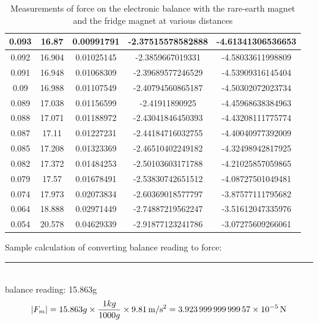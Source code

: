 \documentclass[letterpaper]{article}
\begin{document}
\begin{table}[H]
{\begin{tabular}{|c|c|c|c|c|}
   0.093          & 16.87               & 0.00991791            & -2.37515578582888  & -4.61341306536653 \\ \hline
   0.092          & 16.904              & 0.01025145            & -2.3859667019331   & -4.58033611998809 \\ \hline
   0.091          & 16.948              & 0.01068309            & -2.39689577246529  & -4.53909316145404 \\ \hline
   0.09           & 16.988              & 0.01107549            & -2.40794560865187  & -4.50302072023734 \\ \hline
   0.089          & 17.038              & 0.01156599            & -2.41911890925     & -4.45968638384963 \\ \hline
   0.088          & 17.071              & 0.01188972            & -2.43041846450393  & -4.43208111775774 \\ \hline
   0.087          & 17.11               & 0.01227231            & -2.44184716032755  & -4.40040977392009 \\ \hline
   0.085          & 17.208              & 0.01323369            & -2.46510402249182  & -4.32498942817925 \\ \hline
   0.082          & 17.372              & 0.01484253            & -2.50103603171788  & -4.21025857059865 \\ \hline
   0.079          & 17.57               & 0.01678491            & -2.53830742651512  & -4.08727501049481 \\ \hline
   0.074          & 17.973              & 0.02073834            & -2.60369018577797  & -3.87577111795682 \\ \hline
   0.064          & 18.888              & 0.02971449            & -2.74887219562247  & -3.51612047335976 \\ \hline
   0.054          & 20.578              & 0.04629339            & -2.91877123241786  & -3.07275609266061 \\ \hline
  \end{tabular}%
 }
 \caption{Measurements of force on the electronic balance with the rare-earth magnet and the fridge magnet at various distances}
\end{table}

\noindent Sample calculation of converting balance reading to force:
\\\rule{10cm}{0.01cm}
\\
balance reading: 15.863g
$$|F_m|=15.863g\times\frac{1kg}{1000g}\times\SI{9.81}{\metre\per\second^2}=\SI{3.92399999999957E-05}{\newton}$$
\end{document}
